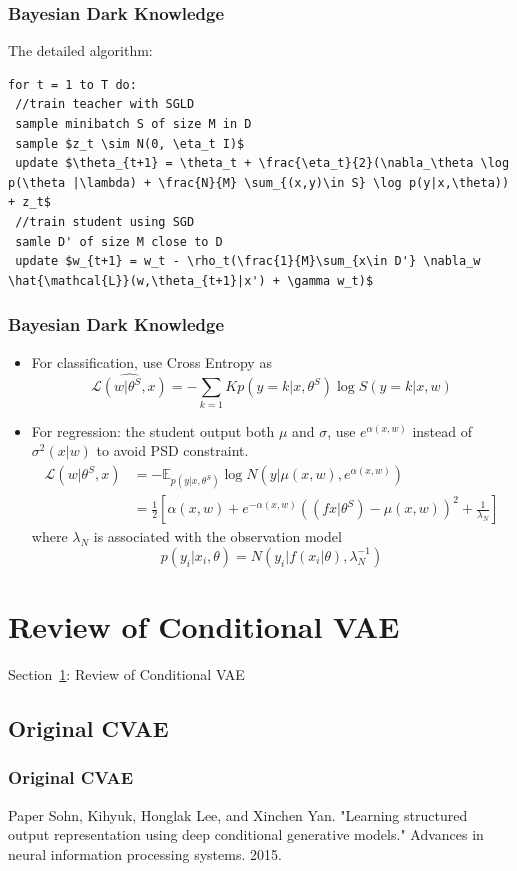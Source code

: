 \documentclass{beamer}
\begin{document}
\begin{frame}
\begin{frame}
\begin{frame}
\begin{frame}
\begin{frame}[fragile]
\frametitle{Bayesian Dark Knowledge}
The detailed algorithm:
\begin{lstlisting}[mathescape=true]
for t = 1 to T do:
 //train teacher with SGLD
 sample minibatch S of size M in D
 sample $z_t \sim N(0, \eta_t I)$
 update $\theta_{t+1} = \theta_t + \frac{\eta_t}{2}(\nabla_\theta \log p(\theta |\lambda) + \frac{N}{M} \sum_{(x,y)\in S} \log p(y|x,\theta)) + z_t$
 //train student using SGD
 samle D' of size M close to D
 update $w_{t+1} = w_t - \rho_t(\frac{1}{M}\sum_{x\in D'} \nabla_w \hat{\mathcal{L}}(w,\theta_{t+1}|x') + \gamma w_t)$
\end{lstlisting}

\end{frame}

\begin{frame}
\frametitle{Bayesian Dark Knowledge}
\begin{itemize}
\item For classification, use Cross Entropy as 
\[
\hat{\mathcal{L}(w|\theta^S, x)} = -\sum_{k=1}{K} p(y=k|x,\theta^S) \log S(y=k|x,w)
\]
\item For regression: the student output both $\mu$ and $\sigma$, use $e^{\alpha(x,w)}$ instead of $\sigma^2(x|w)$ to avoid PSD constraint.
\[
\begin{split}
\hat{\mathcal{L}}(w|\theta^S,x) &= -\mathbb{E}_{p(y|x, \theta^S)} \log N(y|\mu(x,w), e^{\alpha(x,w)}) \\
&= \frac{1}{2}[\alpha(x,w) + e^{-\alpha(x,w)}((fx|\theta^S)-\mu(x,w))^2 + \frac{1}{\lambda_N}]
\end{split}
\]
where $\lambda_N$ is associated with the observation model
\[
p(y_i|x_i,\theta) = N(y_i|f(x_i|\theta), \lambda_N^{-1})
\]
\end{itemize}

\end{frame}

\section{Review of Conditional VAE}
\label{sec-cvae}
\begin{frame}
\centerline{Section~\ref{sec-cvae}: Review of Conditional VAE}
\end{frame}

\subsection{Original CVAE}
\begin{frame}
\frametitle{Original CVAE}
\begin{block}{Paper}
Sohn, Kihyuk, Honglak Lee, and Xinchen Yan. "Learning structured output representation using deep conditional generative models." Advances in neural information processing systems. 2015.
\end{block}


\end{frame}
\end{frame}
\end{frame}
\end{frame}
\end{frame}
\end{document}
